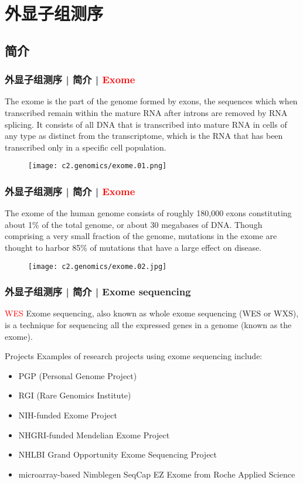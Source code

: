 \section{外显子组测序}
\subsection{简介}
\begin{frame}
  \frametitle{外显子组测序 | 简介 | \textcolor{red}{Exome}}
  The exome is the part of the genome formed by exons, the sequences which when transcribed remain within the mature RNA after introns are removed by RNA splicing. It consists of all DNA that is transcribed into mature RNA in cells of any type as distinct from the transcriptome, which is the RNA that has been transcribed only in a specific cell population.
  \begin{figure}
    \centering
    \texttt{[image: c2.genomics/exome.01.png]}
  \end{figure}
\end{frame}

\begin{frame}
  \frametitle{外显子组测序 | 简介 | \textcolor{red}{Exome}}
  The exome of the human genome consists of roughly 180,000 exons constituting about 1\% of the total genome, or about 30 megabases of DNA. Though comprising a very small fraction of the genome, mutations in the exome are thought to harbor 85\% of mutations that have a large effect on disease.
  \begin{figure}
    \centering
    \texttt{[image: c2.genomics/exome.02.jpg]}
  \end{figure}
\end{frame}

\begin{frame}
  \frametitle{外显子组测序 | 简介 | Exome sequencing}
  \begin{block}{\textcolor{red}{WES}}
  Exome sequencing, also known as whole exome sequencing (WES or WXS), is a technique for sequencing all the expressed genes in a genome (known as the exome).
  \end{block}
  \pause
  \begin{block}{Projects}
    Examples of research projects using exome sequencing include:
    \begin{itemize}
      \item PGP (Personal Genome Project)
      \item RGI (Rare Genomics Institute)
      \item NIH-funded Exome Project
      \item NHGRI-funded Mendelian Exome Project
      \item NHLBI Grand Opportunity Exome Sequencing Project
      \item microarray-based Nimblegen SeqCap EZ Exome from Roche Applied Science
    \end{itemize}
  \end{block}
\end{frame}

